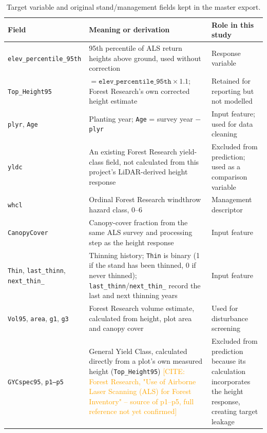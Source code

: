 \documentclass[11pt,a4paper]{report}
\newcommand{\ct}[1]{\textcolor{orange}{[CITE: #1]}}
\begin{document}
\begin{table}[!htbp]
\scriptsize
\setlength{\tabcolsep}{3pt}
\renewcommand{\arraystretch}{0.95}
\begin{tabular}{p{2.6cm}p{7.0cm}p{3.2cm}}
\hline
Field & Meaning or derivation & Role in this study \\
\hline
\texttt{elev\_percentile\_95th} & 95th percentile of ALS return heights above ground, used without correction & Response variable \\
\texttt{Top\_Height95} & $=\texttt{elev\_percentile\_95th}\times1.1$; Forest Research's own corrected height estimate & Retained for reporting but not modelled \\
\texttt{plyr}, \texttt{Age} & Planting year; \texttt{Age} = survey year $-$ \texttt{plyr} & Input feature; used for data cleaning \\
\texttt{yldc} & An existing Forest Research yield-class field, not calculated from this project's LiDAR-derived height response & Excluded from prediction; used as a comparison variable \\
\texttt{whcl} & Ordinal Forest Research windthrow hazard class, 0--6 & Management descriptor \\
\texttt{CanopyCover} & Canopy-cover fraction from the same ALS survey and processing step as the height response & Input feature \\
\texttt{Thin}, \texttt{last\_thinn}, \texttt{next\_thin\_} & Thinning history; \texttt{Thin} is binary (1 if the stand has been thinned, 0 if never thinned); \texttt{last\_thinn}/\texttt{next\_thin\_} record the last and next thinning years & Input feature \\
\texttt{Vol95}, \texttt{area}, \texttt{g1}, \texttt{g3} & Forest Research volume estimate, calculated from height, plot area and canopy cover & Used for disturbance screening \\
\texttt{GYCspec95}, \texttt{p1--p5} & General Yield Class, calculated directly from a plot's own measured height (\texttt{Top\_Height95}) \ct{Forest Research, "Use of Airborne Laser Scanning (ALS) for Forest Inventory" -- source of p1--p5, full reference not yet confirmed} & Excluded from prediction because its calculation
incorporates the height response, creating target leakage \\
\hline
\end{tabular}
\caption{Target variable and original stand/management fields kept in the master export.}
\label{tab:data-fields}
\end{table}
\end{document}
